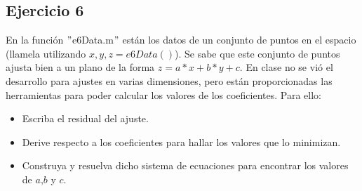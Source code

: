 \documentclass[a4paper,11pt]{article}
\theoremstyle{mytheor}
\begin{document}
\subsection*{Ejercicio 6}
	En la función $"$e6Data.m$"$ están los datos de un conjunto de puntos en el espacio (llamela utilizando $x,y,z = e6Data()$). Se sabe que este conjunto de puntos ajusta bien a un plano de la forma $z= a*x +b*y +c$. En clase no se vió el desarrollo para ajustes en varias dimensiones, pero están proporcionadas las herramientas para poder calcular los valores de los coeficientes. Para ello:
	\begin{itemize}
	\item Escriba el residual del ajuste.
	\item Derive respecto a los coeficientes para hallar los valores que lo minimizan.
	\item Construya y resuelva dicho sistema de ecuaciones para encontrar los valores de $a$,$b$ y $c$.	
	\end{itemize}
\end{document}
